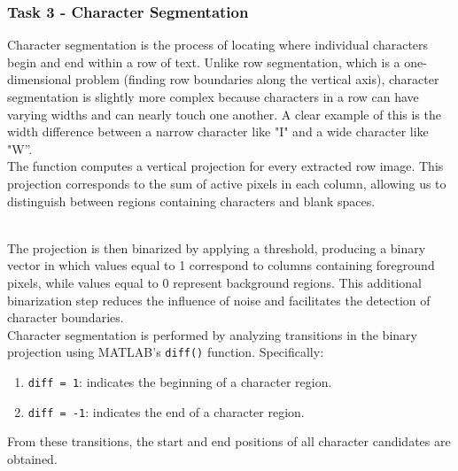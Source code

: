 \subsubsection{Task 3 - Character Segmentation}
Character segmentation is the process of locating where individual characters begin and end within a row of text. Unlike row segmentation, which is a one-dimensional problem (finding row boundaries along the vertical axis), character segmentation is slightly more complex because characters in a row can have varying widths and can nearly touch one another. A clear example of this is the width difference between a narrow character like "I" and a wide character like "W”. \\

The function computes a vertical projection for every extracted row image. This projection corresponds to the sum of active pixels in each column, allowing us to distinguish between regions containing characters and blank spaces.\\\

The projection is then binarized by applying a threshold, producing a binary vector in which values equal to 1 correspond to columns containing foreground pixels, while values equal to 0 represent background regions. This additional binarization step reduces the influence of noise and facilitates the detection of character boundaries.\\

Character segmentation is performed by analyzing transitions in the binary projection using MATLAB’s \texttt{diff()} function. Specifically:

\begin{enumerate}[label=\alph*), leftmargin=1cm]
    \item \texttt{diff = 1}: indicates the beginning of a character region.
    \item \texttt{diff = -1}: indicates the end of a character region.
\end{enumerate}
From these transitions, the start and end positions of all character candidates are obtained.

